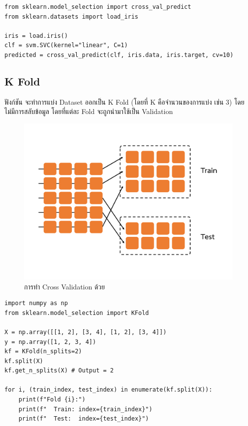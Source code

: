 \begin{lstlisting}[style=MyPython]
from sklearn.model_selection import cross_val_predict
from sklearn.datasets import load_iris

iris = load.iris()
clf = svm.SVC(kernel="linear", C=1)
predicted = cross_val_predict(clf, iris.data, iris.target, cv=10)
\end{lstlisting}

\subsection{K Fold}
\label{ssec:f_fold}

ฟังก์ชัน  จะทำการแบ่ง Dataset ออกเป็น K Fold (โดยที่ K คือจำนวนของการแบ่ง เช่น 3) โดยไม่มีการสลับข้อมูล 
โดยที่แต่ละ Fold จะถูกนำมาใช้เป็น Validation

\begin{figure}[H]
    \centering
    \includegraphics[width=0.9\linewidth,page=4]{fig/cross_validation.pdf}
    \caption{การทำ Cross Validation ด้วย }
    \label{fig:f_fold}
\end{figure}

\begin{lstlisting}[style=MyPython]
import numpy as np
from sklearn.model_selection import KFold

X = np.array([[1, 2], [3, 4], [1, 2], [3, 4]])
y = np.array([1, 2, 3, 4])
kf = KFold(n_splits=2)
kf.split(X)
kf.get_n_splits(X) # Output = 2

for i, (train_index, test_index) in enumerate(kf.split(X)):
    print(f"Fold {i}:")
    print(f"  Train: index={train_index}")
    print(f"  Test:  index={test_index}")
\end{lstlisting}

